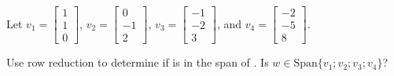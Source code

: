 \documentclass{package/notes}
\begin{document}
\begin{problem}
    Let $v_1 = \left[\begin{array}{c} 1 \\ 1 \\ 0 \end{array} \right]$, $v_2 = \left[\begin{array}{c} 0 \\ -1 \\ 2 \end{array} \right]$, $v_3 = \left[\begin{array}{c} -1 \\ -2 \\ 3 \end{array} \right]$, and $v_4 = \left[\begin{array}{c} -2 \\ -5 \\ 8 \end{array} \right]$.

    Use row reduction to determine if  is in the span of . Is $w \in \mathrm{Span}\{ v_1; v_2; v_3; v_4 \} $?
\end{problem}
\end{document}
